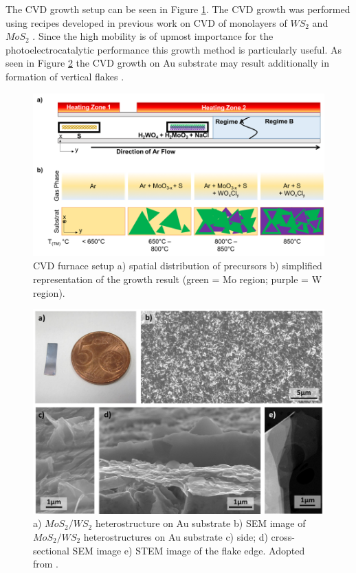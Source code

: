 The CVD growth setup can be seen in Figure \ref{fig:HeterostructureCVDGrowthSetup}. The CVD growth was performed using recipes developed in previous work on CVD of monolayers of $WS_2$ and $MoS_2$ \cite{Reale2017}. Since the high mobility is of upmost importance for the photoelectrocatalytic performance \cite{Li2015a} this growth method is particularly useful. As seen in Figure \ref{fig:HeterostructureSEMImages} the CVD growth on Au substrate may result additionally in formation of vertical flakes \cite{Shi2014}.

\begin{figure}[ht]
	\begin{center}
		\includegraphics[scale=0.4]{Heterostructures/CVDGrowthSetup.png}
		\caption{CVD furnace setup a) spatial distribution of precursors  b) simplified representation of the growth result (green = Mo region;  purple = W region).}
		\label{fig:HeterostructureCVDGrowthSetup}
	\end{center}
\end{figure}

\begin{figure}[ht]
	\begin{center}
		\includegraphics[scale=0.4]{Heterostructures/SEMImages.png}
		\caption{a) $MoS_2/WS_2$ heterostructure on Au substrate b) SEM image of $MoS_2/WS_2$ heterostructures on Au substrate c) side; d) cross-sectional SEM image e) STEM image of the flake edge. Adopted from \cite{Sherrell2019}.}
		\label{fig:HeterostructureSEMImages}
	\end{center}
\end{figure}


